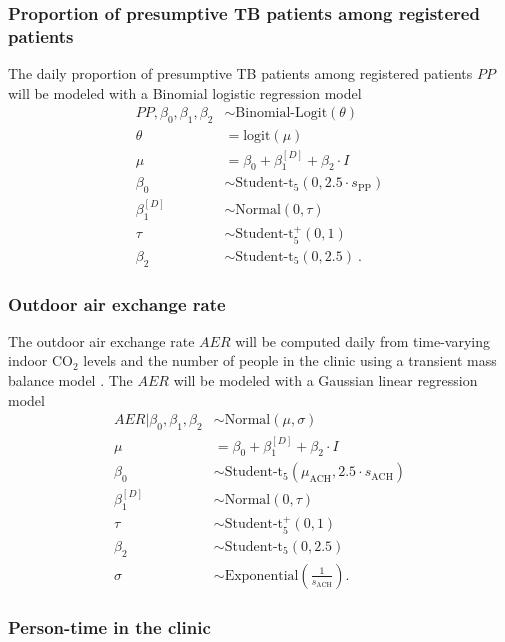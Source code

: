 \documentclass{article}
\begin{document}
\subsubsection{Proportion of presumptive TB patients among registered patients}

The daily proportion of presumptive TB patients among registered patients $PP$ will be modeled with a Binomial logistic regression model
\begin{align*}
    PP, \beta_0, \beta_1, \beta_2 &\sim \text{Binomial-Logit}(\theta) \\
    \theta &= \text{logit}(\mu) \\
    \mu &= \beta_0 + \beta_1^{[D]} + \beta_2 \cdot I \\
    \beta_0 &\sim \text{Student-t}_5(0, 2.5 \cdot s_{\text{PP}}) \\
    \beta_1^{[D]} &\sim \text{Normal}(0, \tau) \\
    \tau &\sim \text{Student-t}_5^{+}(0, 1) \\
    \beta_2 &\sim \text{Student-t}_5\left(0, 2.5\right)~.
\end{align*}

\subsubsection{Outdoor air exchange rate}

The outdoor air exchange rate $AER$ will be computed daily from time-varying indoor CO$_2$ levels and the number of people in the clinic using a transient mass balance model \cite{Batterman2017IJERPH}. The $AER$ will be modeled with a Gaussian linear regression model
\begin{align*}
    AER | \beta_0, \beta_1, \beta_2 &\sim \text{Normal}(\mu, \sigma) \\
    \mu &= \beta_0 + \beta_1^{[D]} + \beta_2 \cdot I \\
    \beta_0 &\sim \text{Student-t}_5(\mu_{\text{ACH}}, 2.5 \cdot s_{\text{ACH}}) \\
    \beta_1^{[D]} &\sim \text{Normal}(0, \tau) \\
    \tau &\sim \text{Student-t}_5^{+}(0, 1) \\
    \beta_2 &\sim \text{Student-t}_5\left(0, 2.5\right) \\
    \sigma &\sim \text{Exponential}\left(\frac{1}{s_{\text{ACH}}}\right).
\end{align*}

\subsubsection{Person-time in the clinic} 
\end{document}
